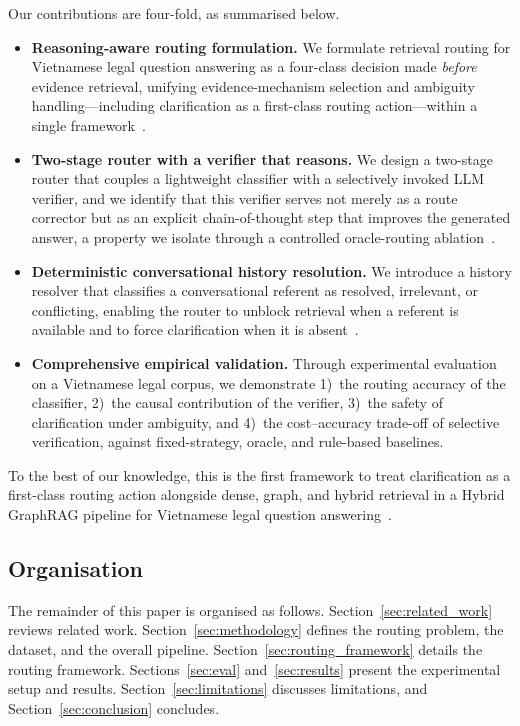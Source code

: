 \documentclass[pdflatex,sn-mathphys-num]{sn-jnl}
\begin{document}
Our contributions are four-fold, as summarised below.
\begin{itemize}
\item \textbf{Reasoning-aware routing formulation.} We formulate retrieval
routing for Vietnamese legal question answering as a four-class decision made
\emph{before} evidence retrieval, unifying evidence-mechanism selection and
ambiguity handling---including clarification as a first-class routing
action---within a single framework~\cite{jeong2024adaptive,min2020ambigqa}.
\item \textbf{Two-stage router with a verifier that reasons.} We design a
two-stage router that couples a lightweight classifier with a selectively
invoked LLM verifier, and we identify that this verifier serves not merely as
a route corrector but as an explicit chain-of-thought step that improves the
generated answer, a property we isolate through a controlled oracle-routing
ablation~\cite{chen2023frugalgpt}.
\item \textbf{Deterministic conversational history resolution.} We introduce a
history resolver that classifies a conversational referent as resolved,
irrelevant, or conflicting, enabling the router to unblock retrieval when a
referent is available and to force clarification when it is
absent~\cite{elgohary2019canard}.
\item \textbf{Comprehensive empirical validation.} Through experimental
evaluation on a Vietnamese legal corpus, we demonstrate 1)~the routing
accuracy of the classifier, 2)~the causal contribution of the verifier, 3)~the
safety of clarification under ambiguity, and 4)~the cost--accuracy trade-off
of selective verification, against fixed-strategy, oracle, and rule-based
baselines.
\end{itemize}

To the best of our knowledge, this is the first framework to treat
clarification as a first-class routing action alongside dense, graph, and
hybrid retrieval in a Hybrid GraphRAG pipeline for Vietnamese legal question
answering~\cite{sovrano2020legalkg,zhong2020nlp_law}.

\subsection{Organisation}\label{subsec:organisation}

The remainder of this paper is organised as follows.
Section~\ref{sec:related_work} reviews related work.
Section~\ref{sec:methodology} defines the routing problem, the dataset, and
the overall pipeline. Section~\ref{sec:routing_framework} details the routing
framework. Sections~\ref{sec:eval} and~\ref{sec:results} present the
experimental setup and results. Section~\ref{sec:limitations} discusses
limitations, and Section~\ref{sec:conclusion} concludes.
\end{document}

